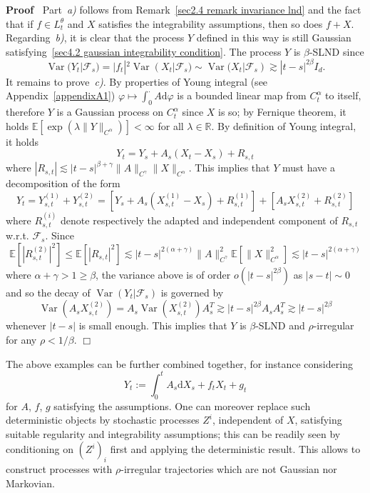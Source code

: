 \documentclass[10pt]{article}
\newcommand{\assign}{:=}
\newcommand{\mathd}{\mathrm{d}}
\newcommand{\nobracket}{}
\newcommand{\tmop}[1]{\ensuremath{\operatorname{#1}}}
\newcommand{\tmtextit}[1]{{\itshape{#1}}}
\newenvironment{proof}{\noindent\textbf{Proof\ }}{\hspace*{\fill}$\Box$\medskip}
\begin{document}
\begin{proof}
  Part~\tmtextit{a)} follows from Remark~\ref{sec2.4 remark invariance lnd}
  and the fact that if $f \in L^{\theta}_t$ and $X$ satisfies the
  integrability assumptions, then so does $f + X$. Regarding~\tmtextit{b)}, it
  is clear that the process $Y$ defined in this way is still Gaussian
  satisfying~{\eqref{sec4.2 gaussian integrability condition}}. The process
  $Y$ is $\beta$-SLND since
  \[ \tmop{Var} (Y_t | \mathcal{F}_s \nobracket) = | f_t |^2 \tmop{Var} (X_t |
     \mathcal{F}_s \nobracket) \sim \tmop{Var} (X_t | \mathcal{F}_s
     \nobracket) \gtrsim | t - s |^{2 \beta} I_d . \]
  It remains to prove~\tmtextit{c)}. By properties of Young integral (see
  Appendix~\ref{appendixA1}) $\varphi \mapsto \int_0^{\cdot} A \mathd \varphi$
  is a bounded linear map from $C^{\alpha}_t$ to itself, therefore $Y$ is a
  Gaussian process on $C^{\alpha}_t$ since $X$ is so; by Fernique theorem, it
  holds $\mathbb{E} [\exp (\lambda \| Y \|_{C^{\alpha}})] < \infty$ for all
  $\lambda \in \mathbb{R}$. By definition of Young integral, it holds
  \[ Y_t = Y_s + A_s (X_t - X_s) + R_{s, t} \]
  where $| R_{s, t} | \lesssim | t - s |^{\beta + \gamma} \| A \|_{C^{\gamma}}
  \| X \|_{C^{\alpha}}$. This implies that $Y$ must have a decomposition of
  the form
  \[ Y_t = Y_{s, t}^{(1)} + Y_{s, t}^{(2)} = [Y_s + A_s (X^{(1)}_{s, t} - X_s)
     + R^{(1)}_{s, t}] + [A_s X^{(2)}_{s, t} + R^{(2)}_{s, t}] \]
  where $R^{(i)}_{s, t}$ denote respectively the adapted and independent
  component of $R_{s, t}$ w.r.t. $\mathcal{F}_s$. Since
  \[ \mathbb{E} [| R^{(2)}_{s, t} |^2] \leqslant \mathbb{E} [| R_{s, t} |^2]
     \lesssim | t - s |^{2 (\alpha + \gamma)}  \| A \|_{C^{\gamma}}^2
     \mathbb{E} [\| X \|^2_{C^{\alpha}}] \lesssim | t - s |^{2 (\alpha +
     \gamma)} \]
  where $\alpha + \gamma > 1 \geqslant \beta$, the variance above is of order
  $o (| t - s |^{2 \beta})$ as $| s - t | \sim 0$ and so the decay of
  $\tmop{Var} (Y_t | \mathcal{F}_s \nobracket)$ is governed by
  \[ \tmop{Var} (A_s X_{s, t}^{(2)}) = A_s \tmop{Var} (X^{(2)}_{s, t}) A^T_s
     \gtrsim | t - s |^{2 \beta} A_s A_s^T \gtrsim | t - s |^{2 \beta} \]
  whenever $| t - s |$ is small enough. This implies that $Y$ is
  $\beta$\mbox{-}SLND and $\rho$-irregular for any $\rho < 1 / \beta$.
\end{proof}

\begin{remark}
  The above examples can be further combined together, for instance
  considering
  \[ Y_t \assign \int_0^t A_s \mathd X_s + f_t X_t + g_t \]
  for $A$, $f$, $g$ satisfying the assumptions. One can moreover replace such
  deterministic objects by stochastic processes $Z^i$, independent of $X$,
  satisfying suitable regularity and integrability assumptions; this can be
  readily seen by conditioning on $(Z^i)_i$ first and applying the
  deterministic result. This allows to construct processes with
  $\rho$-irregular trajectories which are not Gaussian nor Markovian.
\end{remark}
\end{document}
